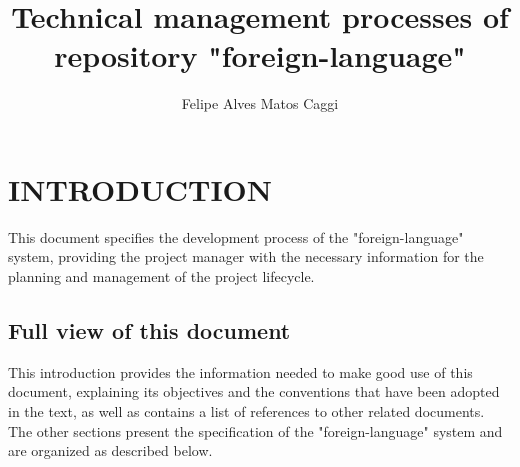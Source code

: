 \documentclass[11pt, twoside, a4paper]{book}
\begin{document}
    
        \title{Technical management processes of repository "foreign-language"}
        \author{Felipe Alves Matos Caggi}
        \maketitle
        
        \tableofcontents
        \newpage

        
        \chapter{INTRODUCTION}
        	
        	This document specifies the development process of the "foreign-language" system, providing the project manager with the necessary information for the planning and management of the project lifecycle.

            
            \section{Full view of this document}
            
                This introduction provides the information needed to make good use of this document, explaining its objectives and the conventions that have been adopted in the text, as well as contains a list of references to other related documents. The other sections present the specification of the "foreign-language" system and are organized as described below.
                
\end{document}
